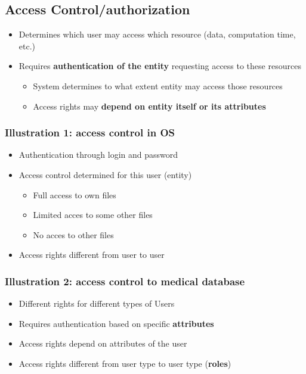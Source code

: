 \documentclass[11pt,british,faculty=ea,layout=titlefont,underline=false,titleUppercase=true,titleUnderline=true,hidelinks]{ugent2016-report}
\begin{document}
		\subsection{Access Control/authorization} \label{sub:access-control-authorization}
			\begin{itemize}
				\item Determines which user may access which resource (data, computation time, etc.)
				\item Requires \textbf{authentication of the entity} requesting access to these resources
				\begin{itemize}
					\item System determines to what extent entity may access those resources
					\item Access rights may \textbf{depend on entity itself or its attributes}
				\end{itemize}
			\end{itemize}

			\subsubsection{Illustration 1: access control in OS} \label{subsub:access-control-in-os}
				\begin{itemize}
					\item Authentication through login and password
					\item Access control determined for this user (entity)
						\begin{itemize}
							\item Full access to own files
							\item Limited acces to some other files
							\item No acces to other files
						\end{itemize}
					\item Access rights different from user to user
				\end{itemize}
			
			\subsubsection{Illustration 2: access control to medical database} \label{subsub:access-control-to-medical-database}
				\begin{itemize}
					\item Different rights for different types of Users
					\item Requires authentication based on specific \textbf{attributes}
					\item Access rights depend on attributes of the user
					\item Access rights different from user type to user type (\textbf{roles})
				\end{itemize}
\end{document}
